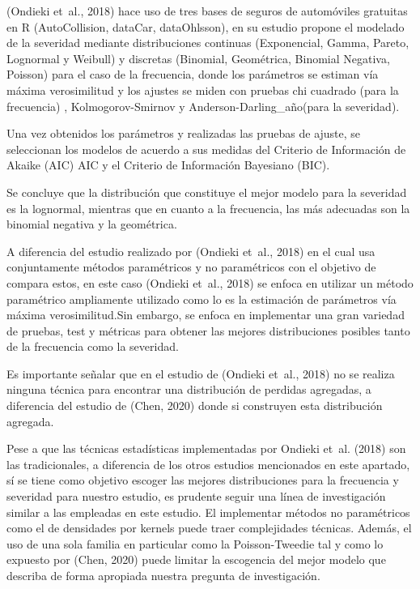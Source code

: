 \documentclass[
  letterpaper,
  onepage,
  openany]{scrreprt}
\begin{document}
(Ondieki et~al., 2018) hace uso de tres bases de seguros de automóviles
gratuitas en R (AutoCollision, dataCar, dataOhlsson), en su estudio
propone el modelado de la severidad mediante distribuciones continuas
(Exponencial, Gamma, Pareto, Lognormal y Weibull) y discretas (Binomial,
Geométrica, Binomial Negativa, Poisson) para el caso de la frecuencia,
donde los parámetros se estiman vía máxima verosimilitud y los ajustes
se miden con pruebas chi cuadrado (para la frecuencia) ,
Kolmogorov-Smirnov y Anderson-Darling\_año(para la severidad).

Una vez obtenidos los parámetros y realizadas las pruebas de ajuste, se
seleccionan los modelos de acuerdo a sus medidas del Criterio de
Información de Akaike (AIC) AIC y el Criterio de Información Bayesiano
(BIC).

Se concluye que la distribución que constituye el mejor modelo para la
severidad es la lognormal, mientras que en cuanto a la frecuencia, las
más adecuadas son la binomial negativa y la geométrica.

A diferencia del estudio realizado por (Ondieki et~al., 2018) en el cual
usa conjuntamente métodos paramétricos y no paramétricos con el objetivo
de compara estos, en este caso (Ondieki et~al., 2018) se enfoca en
utilizar un método paramétrico ampliamente utilizado como lo es la
estimación de parámetros vía máxima verosimilitud.Sin embargo, se enfoca
en implementar una gran variedad de pruebas, test y métricas para
obtener las mejores distribuciones posibles tanto de la frecuencia como
la severidad.

Es importante señalar que en el estudio de (Ondieki et~al., 2018) no se
realiza ninguna técnica para encontrar una distribución de perdidas
agregadas, a diferencia del estudio de (Chen, 2020) donde si construyen
esta distribución agregada.

Pese a que las técnicas estadísticas implementadas por Ondieki et~al.
(2018) son las tradicionales, a diferencia de los otros estudios
mencionados en este apartado, sí se tiene como objetivo escoger las
mejores distribuciones para la frecuencia y severidad para nuestro
estudio, es prudente seguir una línea de investigación similar a las
empleadas en este estudio. El implementar métodos no paramétricos como
el de densidades por kernels puede traer complejidades técnicas. Además,
el uso de una sola familia en particular como la Poisson-Tweedie tal y
como lo expuesto por (Chen, 2020) puede limitar la escogencia del mejor
modelo que describa de forma apropiada nuestra pregunta de
investigación.
\end{document}
